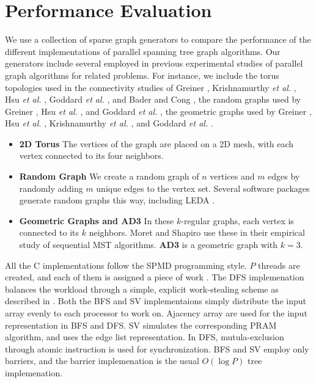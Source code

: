 \section{Performance Evaluation}\label{s:results}

We use a collection of sparse graph generators to compare the performance of the different implementations of 
parallel spanning tree graph algorithms. Our generators include several employed in previous
experimental studies of parallel graph algorithms for related
problems. For instance, we include the torus topologies used in the connectivity studies of Greiner
\cite{Gre94}, Krishnamurthy \emph{et al.} \cite{KLC97}, Hsu \emph{et
  al.} \cite{HRD97}, Goddard \emph{et al.} \cite{GKP97}, and Bader and Cong \cite{BC04b}, the
random graphs used by Greiner \cite{Gre94}, Hsu \emph{et al.}  \cite{HRD97}, and Goddard \emph{et
  al.} \cite{GKP97}, the geometric graphs used by
Greiner \cite{Gre94}, Hsu \emph{et al.} \cite{HRD97}, Krishnamurthy
\emph{et al.} \cite{KLC97}, and Goddard \emph{et al.} \cite{GKP97}.

\begin{itemize}
\itemsep0pt

\item \textbf{2D Torus} The vertices of the graph are placed on a 2D
  mesh, with each vertex connected to its four neighbors.  

\item \textbf{Random Graph} We create a random graph of $n$ vertices
  and $m$ edges by randomly adding $m$ unique edges to the vertex
  set. Several software packages generate random graphs this way,
  including LEDA \cite{MN99}.
  
\item \textbf{Geometric Graphs and AD3} In these $k$-regular graphs,
  each vertex is connected to its $k$ %
  neighbors.  Moret and Shapiro \cite{MS94} use these
  in their empirical study of sequential MST algorithms. \textbf{AD3}
  is a geometric graph with $k=3$.  
\end{itemize}


All the C implementations follow the SPMD programming style.  $P$ threads are created, and each of them is assigned a piece of work .  The DFS implemenation balances the workload through a simple, explicit work-stealing scheme as described in \cite{BL94}.  Both the BFS and SV implementaions simply distribute the input array evenly to each processor to work on. 
Ajacency array are used for the input representation in BFS and DFS.  SV simulates the corresponding PRAM algorithm, and uses the edge list representation.
In DFS, mutula-exclusion through atomic instruction is used for synchronization.  BFS and SV employ only barriers, and the barrier implemenation is the usual $O(\log P)$ tree implemenation.

